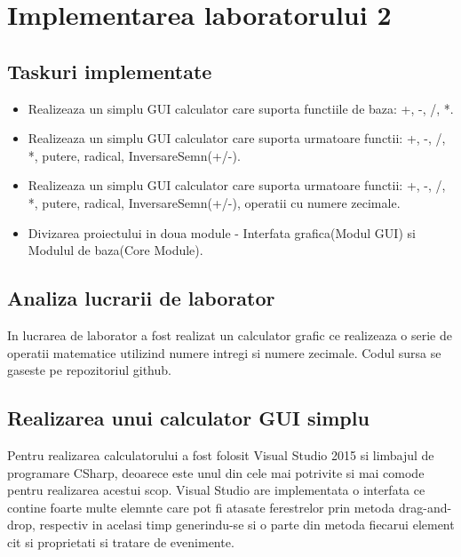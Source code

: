 \section{Implementarea laboratorului 2 }

\subsection{Taskuri implementate}

\begin{itemize}
\item Realizeaza un simplu GUI calculator care suporta functiile de baza: +, -, /, *.
\item Realizeaza un simplu GUI calculator care suporta urmatoare functii: +, -, /, *, putere, radical, InversareSemn(+/-).

\item Realizeaza un simplu GUI calculator care suporta urmatoare functii: +, -, /, *, putere, radical, InversareSemn(+/-), operatii cu numere zecimale.

\item Divizarea proiectului in doua module - Interfata grafica(Modul GUI) si Modulul de baza(Core Module).

\end{itemize}

\subsection{Analiza lucrarii de laborator}

In lucrarea de laborator a fost realizat un calculator grafic ce realizeaza o serie de operatii matematice 
utilizind numere intregi si numere zecimale.
Codul sursa se gaseste pe repozitoriul github.

\subsection{Realizarea unui calculator GUI simplu}

Pentru realizarea calculatorului a fost folosit Visual Studio 2015 si limbajul de programare CSharp, 
deoarece este unul din cele mai potrivite si mai comode pentru realizarea acestui scop.
Visual Studio are implementata o interfata ce contine foarte multe elemnte care pot fi atasate 
ferestrelor prin metoda drag-and-drop, respectiv in acelasi timp generindu-se si o parte din 
metoda fiecarui element cit si proprietati si tratare de evenimente.

